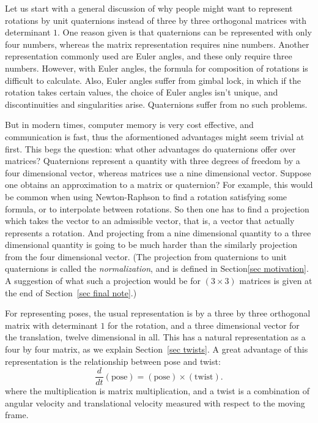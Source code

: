 \documentclass[reqno,12pt]{amsart}
\begin{document}
Let us start with a general discussion of why people might want to represent rotations by unit quaternions instead of three by three orthogonal matrices with determinant $1$.  One reason given is that quaternions can be represented with only four numbers, whereas the matrix representation requires nine numbers.  Another representation commonly used are Euler angles, and these only require three numbers.  However, with Euler angles, the formula for composition of rotations is difficult to calculate.  Also, Euler angles suffer from gimbal lock, in which if the rotation takes certain values, the choice of Euler angles isn't unique, and discontinuities and singularities arise.  Quaternions suffer from no such problems.

But in modern times, computer memory is very cost effective, and communication is fast, thus the aformentioned advantages might seem trivial at first.  This begs the question: what other advantages do quaternions offer over matrices?  Quaternions represent a quantity with three degrees of freedom by a four dimensional vector, whereas matrices use a nine dimensional vector.  Suppose one obtains an approximation to a matrix or quaternion?  For example, this would be common when using Newton-Raphson to find a rotation satisfying some formula, or to interpolate between rotations.  So then one has to find a projection which takes the vector to an admissible vector, that is, a vector that actually represents a rotation.  And projecting from a nine dimensional quantity to a three dimensional quantity is going to be much harder than the similarly projection from the four dimensional vector.  (The projection from quaternions to unit quaternions is called the \emph{normalization}, and is defined in Section\ref{sec motivation}.  A suggestion of what such a projection would be for $(3 \times 3)$ matrices is given at the end of Section~\ref{sec final note}.)

For representing poses, the usual representation is by a three by three orthogonal matrix with determinant $1$ for the rotation, and a three dimensional vector for the translation, twelve dimensional in all.  This has a natural representation as a four by four matrix, as we explain Section~\ref{sec twists}.  A great advantage of this representation is the relationship between pose and twist:
\begin{equation}
\label{pose twist}
\frac d{dt} (\text{pose}) = (\text{pose}) \times (\text{twist}).
\end{equation}
where the multiplication is matrix multiplication, and a twist is a combination of angular velocity and translational velocity measured with respect to the moving frame.
\end{document}
